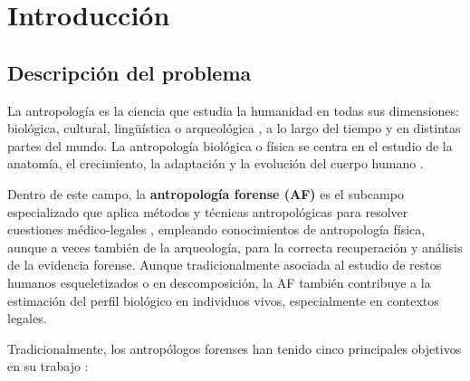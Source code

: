 
\chapter{Introducción}


\section{Descripción del problema}

La antropología es la ciencia que estudia la humanidad en todas sus dimensiones: biológica, cultural, 
lingüística o arqueológica \cite{AAA2022AnthropologyDefinition}, a lo largo del tiempo y en distintas partes 
del mundo. La antropología biológica o física se centra en el estudio de la anatomía, el crecimiento, la 
adaptación y la evolución del cuerpo humano \cite{nawrocki2006}. 

Dentro de este campo, la \textbf{antropología forense (AF)} es el subcampo especializado que aplica métodos y 
técnicas antropológicas para resolver cuestiones médico-legales \cite{nawrocki2006}, empleando conocimientos 
de antropología física, aunque a veces también de la arqueología, para la correcta recuperación y análisis de 
la evidencia forense.
Aunque tradicionalmente asociada al estudio de restos humanos esqueletizados o en descomposición, la AF 
también contribuye a la estimación del perfil biológico en individuos vivos, especialmente en contextos 
legales.

Tradicionalmente, los antropólogos forenses han tenido cinco principales objetivos en su trabajo 
\cite{byers2023}:

